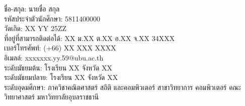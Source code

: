 {\begin{biography}
\justify
ชื่อ-สกุล: นายชื่อ สกุล \\
รหัสประจำตัวนักศึกษา: 5811400000\\
วัดเกิด: XX YY 25ZZ\\
ที่อยู่ที่สามารถติดต่อได้: XX ม.XX ต.XX อ.XX จ.XX 34XXX\\
เบอร์โทรศัพท์: (+66) XX XXX XXXX\\
อิเมลล์: xxxxxxx.yy.59@ubu.ac.th\\
ระดับมัธยมต้น: โรงเรียน XX จังหวัด XX\\
ระดับมัธยมปลาย: โรงเรียน XX จังหวัด XX\\
ระดับอุดมศึกษา: ภาควิชาคณิตศาสตร์ สถิติ และคอมพิวเตอร์ สาขาวิทยาการ คอมพิวเตอร์ คณะวิทยาศาสตร์ มหาวิทยาลัยอุบลราชธานี
\end{biography}}


